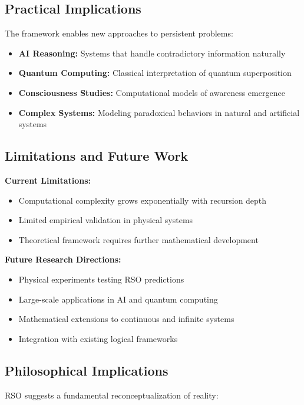 \documentclass[11pt,a4paper]{article}
\begin{document}
\subsection{Practical Implications}

The framework enables new approaches to persistent problems:

\begin{itemize}
    \item \textbf{AI Reasoning:} Systems that handle contradictory information naturally
    \item \textbf{Quantum Computing:} Classical interpretation of quantum superposition
    \item \textbf{Consciousness Studies:} Computational models of awareness emergence
    \item \textbf{Complex Systems:} Modeling paradoxical behaviors in natural and artificial systems
\end{itemize}

\subsection{Limitations and Future Work}

\textbf{Current Limitations:}
\begin{itemize}
    \item Computational complexity grows exponentially with recursion depth
    \item Limited empirical validation in physical systems
    \item Theoretical framework requires further mathematical development
\end{itemize}

\textbf{Future Research Directions:}
\begin{itemize}
    \item Physical experiments testing RSO predictions
    \item Large-scale applications in AI and quantum computing
    \item Mathematical extensions to continuous and infinite systems
    \item Integration with existing logical frameworks
\end{itemize}

\subsection{Philosophical Implications}

RSO suggests a fundamental reconceptualization of reality:
\end{document}
